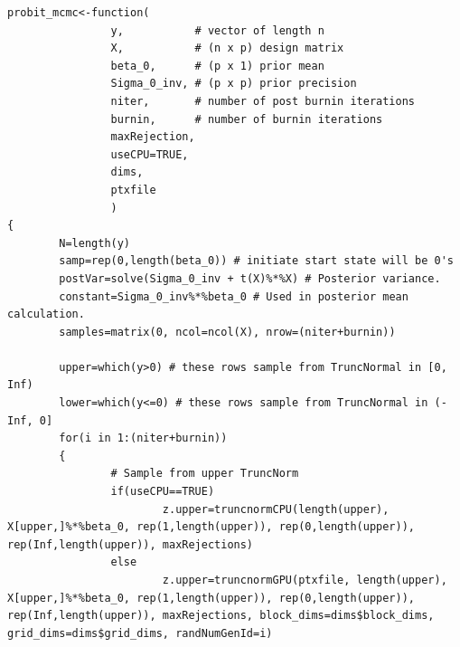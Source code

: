 \documentclass{article}
\begin{document}
\begin{verbatim}
probit_mcmc<-function(                                                          
                y,           # vector of length n                               
                X,           # (n x p) design matrix                            
                beta_0,      # (p x 1) prior mean                               
                Sigma_0_inv, # (p x p) prior precision                          
                niter,       # number of post burnin iterations                 
                burnin,      # number of burnin iterations                      
                maxRejection,                                                   
                useCPU=TRUE,                                                    
                dims,                                                           
                ptxfile                                                         
                )                                                               
{                                                                               
        N=length(y)                                                             
        samp=rep(0,length(beta_0)) # initiate start state will be 0's           
        postVar=solve(Sigma_0_inv + t(X)%*%X) # Posterior variance.             
        constant=Sigma_0_inv%*%beta_0 # Used in posterior mean calculation.     
        samples=matrix(0, ncol=ncol(X), nrow=(niter+burnin))                    
                                                                                
        upper=which(y>0) # these rows sample from TruncNormal in [0, Inf)       
        lower=which(y<=0) # these rows sample from TruncNormal in (-Inf, 0]     
        for(i in 1:(niter+burnin))                                              
        {                                                                       
                # Sample from upper TruncNorm                                   
                if(useCPU==TRUE)                                                
                        z.upper=truncnormCPU(length(upper), X[upper,]%*%beta_0, rep(1,length(upper)), rep(0,length(upper)), rep(Inf,length(upper)), maxRejections)
                else                                                            
                        z.upper=truncnormGPU(ptxfile, length(upper), X[upper,]%*%beta_0, rep(1,length(upper)), rep(0,length(upper)), rep(Inf,length(upper)), maxRejections, block_dims=dims$block_dims, grid_dims=dims$grid_dims, randNumGenId=i)
                                                                                

\end{verbatim}
\end{document}
